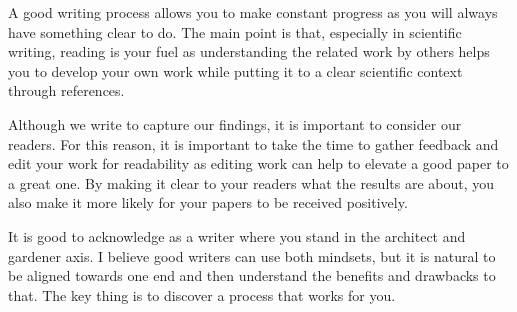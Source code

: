A good writing process allows you to make constant progress as you will always have something clear to do.
The main point is that, especially in scientific writing, reading is your fuel as understanding the related work by others helps you to develop your own work while putting it to a clear scientific context through references.

Although we write to capture our findings, it is important to consider our readers.
For this reason, it is important to take the time to gather feedback and edit your work for readability as editing work can help to elevate a good paper to a great one.
By making it clear to your readers what the results are about, you also make it more likely for your papers to be received positively.

It is good to acknowledge as a writer where you stand in the architect and gardener axis.
I believe good writers can use both mindsets, but it is natural to be aligned towards one end and then understand the benefits and drawbacks to that.
The key thing is to discover a process that works for you.
